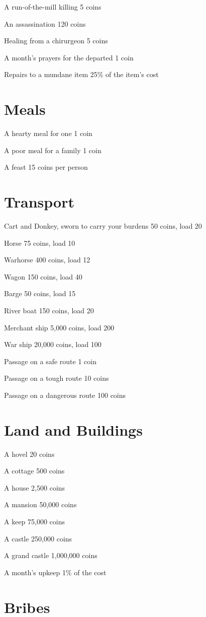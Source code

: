  A run-of-the-mill killing 5 coins


 An assassination 120 coins


 Healing from a chirurgeon 5 coins


 A month's prayers for the departed 1 coin


 Repairs to a mundane item 25\% of the item's cost
\section{Meals}


 A hearty meal for one 1 coin


 A poor meal for a family 1 coin


 A feast 15 coins per person
\section{Transport}


 Cart and Donkey, sworn to carry your burdens 50 coins, load 20


 Horse 75 coins, load 10


 Warhorse 400 coins, load 12


 Wagon 150 coins, load 40


 Barge 50 coins, load 15


 River boat 150 coins, load 20


 Merchant ship 5,000 coins, load 200


 War ship 20,000 coins, load 100


 Passage on a safe route 1 coin


 Passage on a tough route 10 coins


 Passage on a dangerous route 100 coins
\section{Land and Buildings}


 A hovel 20 coins


 A cottage 500 coins


 A house 2,500 coins


 A mansion 50,000 coins


 A keep 75,000 coins


 A castle 250,000 coins


 A grand castle 1,000,000 coins


 A month's upkeep 1\% of the cost
\section{Bribes}


